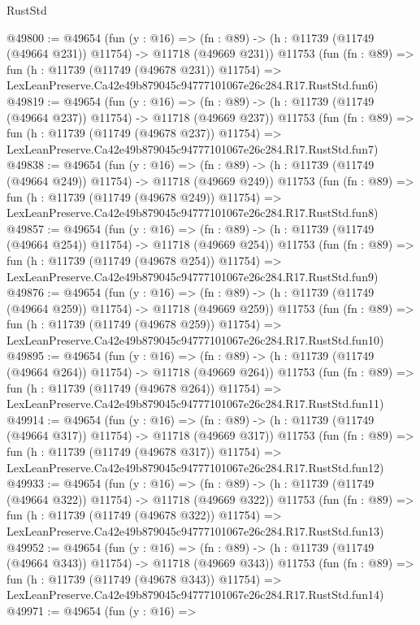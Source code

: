 \begin{lexlean}{RustStd}
\begin{coremodule}
@49800 := @49654
    (fun (y : @16) =>
    (fn : @89) -> (h : @11739 (@11749 (@49664 @231)) @11754) -> @11718 (@49669 @231))
    @11753
    (fun (fn : @89) =>
    fun (h : @11739 (@11749 (@49678 @231)) @11754) =>
    LexLeanPreserve.Ca42e49b879045c94777101067e26c284.R17.RustStd.fun6)
@49819 := @49654
    (fun (y : @16) =>
    (fn : @89) -> (h : @11739 (@11749 (@49664 @237)) @11754) -> @11718 (@49669 @237))
    @11753
    (fun (fn : @89) =>
    fun (h : @11739 (@11749 (@49678 @237)) @11754) =>
    LexLeanPreserve.Ca42e49b879045c94777101067e26c284.R17.RustStd.fun7)
@49838 := @49654
    (fun (y : @16) =>
    (fn : @89) -> (h : @11739 (@11749 (@49664 @249)) @11754) -> @11718 (@49669 @249))
    @11753
    (fun (fn : @89) =>
    fun (h : @11739 (@11749 (@49678 @249)) @11754) =>
    LexLeanPreserve.Ca42e49b879045c94777101067e26c284.R17.RustStd.fun8)
@49857 := @49654
    (fun (y : @16) =>
    (fn : @89) -> (h : @11739 (@11749 (@49664 @254)) @11754) -> @11718 (@49669 @254))
    @11753
    (fun (fn : @89) =>
    fun (h : @11739 (@11749 (@49678 @254)) @11754) =>
    LexLeanPreserve.Ca42e49b879045c94777101067e26c284.R17.RustStd.fun9)
@49876 := @49654
    (fun (y : @16) =>
    (fn : @89) -> (h : @11739 (@11749 (@49664 @259)) @11754) -> @11718 (@49669 @259))
    @11753
    (fun (fn : @89) =>
    fun (h : @11739 (@11749 (@49678 @259)) @11754) =>
    LexLeanPreserve.Ca42e49b879045c94777101067e26c284.R17.RustStd.fun10)
@49895 := @49654
    (fun (y : @16) =>
    (fn : @89) -> (h : @11739 (@11749 (@49664 @264)) @11754) -> @11718 (@49669 @264))
    @11753
    (fun (fn : @89) =>
    fun (h : @11739 (@11749 (@49678 @264)) @11754) =>
    LexLeanPreserve.Ca42e49b879045c94777101067e26c284.R17.RustStd.fun11)
@49914 := @49654
    (fun (y : @16) =>
    (fn : @89) -> (h : @11739 (@11749 (@49664 @317)) @11754) -> @11718 (@49669 @317))
    @11753
    (fun (fn : @89) =>
    fun (h : @11739 (@11749 (@49678 @317)) @11754) =>
    LexLeanPreserve.Ca42e49b879045c94777101067e26c284.R17.RustStd.fun12)
@49933 := @49654
    (fun (y : @16) =>
    (fn : @89) -> (h : @11739 (@11749 (@49664 @322)) @11754) -> @11718 (@49669 @322))
    @11753
    (fun (fn : @89) =>
    fun (h : @11739 (@11749 (@49678 @322)) @11754) =>
    LexLeanPreserve.Ca42e49b879045c94777101067e26c284.R17.RustStd.fun13)
@49952 := @49654
    (fun (y : @16) =>
    (fn : @89) -> (h : @11739 (@11749 (@49664 @343)) @11754) -> @11718 (@49669 @343))
    @11753
    (fun (fn : @89) =>
    fun (h : @11739 (@11749 (@49678 @343)) @11754) =>
    LexLeanPreserve.Ca42e49b879045c94777101067e26c284.R17.RustStd.fun14)
@49971 := @49654
    (fun (y : @16) =>

\end{coremodule}
\end{lexlean}
